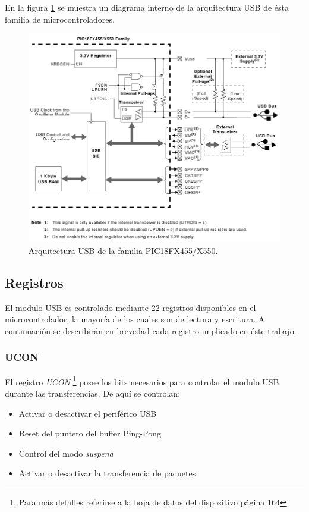 En la figura \ref{fig:pic_usb_internal} se muestra un diagrama interno de
la arquitectura USB de \'esta familia de microcontroladores.

\begin{figure}[htp]
\centering
\includegraphics[scale=0.5]{./img/pic_usb_internal.png}
\caption{Arquitectura USB de la familia PIC18FX455/X550.}
\label{fig:pic_usb_internal}
\end{figure}


\subsection{Registros}
El modulo USB es controlado mediante 22 registros disponibles en el
microcontrolador, la mayor\'ia de los cuales son de lectura y escritura.
A continuaci\'on se describir\'an en brevedad cada registro implicado en
\'este trabajo.

\subsubsection{UCON}
El registro \emph{UCON} \footnote{Para m\'as detalles referirse a la hoja de
datos del dispositivo p\'agina 164} posee los bits necesarios para controlar el
modulo USB durante las transferencias. De aqu\'i se controlan:

\begin{itemize}
 \item Activar o desactivar el perif\'erico USB

 \item Reset del puntero del buffer Ping-Pong  

 \item Control del modo \emph{suspend}

 \item Activar o desactivar la transferencia de paquetes
\end{itemize}

